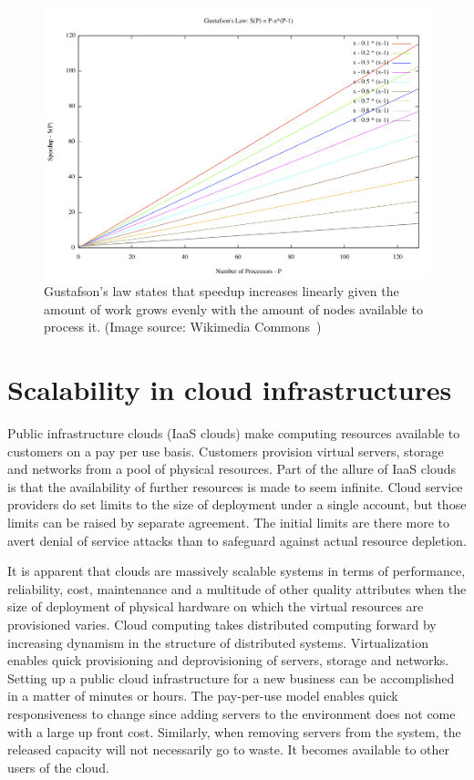 \documentclass[english]{tktltiki2}
\theoremstyle{definition}
\theoremstyle{remark}
\begin{document}
\begin{figure}[h!]
	\includegraphics[width=\textwidth]{images/GustafsonsLaw}
	\caption{Gustafson's law states that speedup increases linearly given the 
	amount of 
	work grows evenly with the amount of nodes available to process it. (Image 
	source: 
	Wikimedia Commons~\cite{gustafsonslawimage})}
	\label{fig:gustafsonsLaw}
\end{figure}



\section{Scalability in cloud infrastructures}
\label{sec:cloudscalability}

Public infrastructure clouds (IaaS clouds) make computing resources available to
customers on a pay per use basis. Customers provision virtual servers, storage
and networks from a pool of physical resources. Part of the allure of IaaS
clouds is that the availability of further resources is made to seem infinite.
Cloud service providers do set limits to the size of deployment under a single
account, but those limits can be raised by separate agreement. The initial
limits are there more to avert denial of service attacks than to safeguard
against actual resource depletion.

It is apparent that clouds are massively scalable systems in terms of
performance, reliability, cost, maintenance and a multitude of other quality
attributes when the size of deployment of physical hardware on which the virtual
resources are provisioned varies. Cloud computing takes distributed computing
forward by increasing dynamism in the structure of distributed systems.
Virtualization enables quick provisioning and deprovisioning of servers, storage
and networks. Setting up a public cloud infrastructure for a new business can be
accomplished in a matter of minutes or hours. The pay-per-use model enables
quick responsiveness to change since adding servers to the environment does not
come with a large up front cost. Similarly, when removing servers from the
system, the released capacity will not necessarily go to waste. It becomes
available to other users of the cloud.
\end{document}

